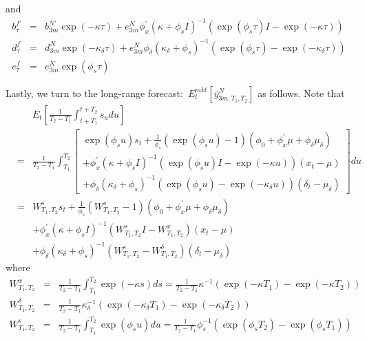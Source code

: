 \documentclass{article}
\begin{document}
and%
\begin{eqnarray*}
b_{\tau }^{f\prime } &=&b_{3m}^{N\prime }\exp \left( -\kappa \tau \right)
+e_{3m}^{N}\phi _{x}^{\prime }\left( \kappa +\phi _{s}I\right) ^{-1}\left(
\exp \left( \phi _{s}\tau \right) I-\exp \left( -\kappa \tau \right) \right)
\\
d_{\tau }^{f} &=&d_{3m}^{N}\exp \left( -\kappa _{\delta }\tau \right)
+e_{3m}^{N}\phi _{\delta }\left( \kappa _{\delta }+\phi _{s}\right)
^{-1}\left( \exp \left( \phi _{s}\tau \right) -\exp \left( -\kappa _{\delta
}\tau \right) \right) \\
e_{\tau }^{f} &=&e_{3m}^{N}\exp \left( \phi _{s}\tau \right)
\end{eqnarray*}

Lastly, we turn to the long-range forecast:\ $E_{t}^{mkt}\left[ \overline{y}%
_{3m,T_{1},T_{2}}^{N}\right] $ as follows. Note that%
\begin{eqnarray*}
&&E_{t}\left[ \frac{1}{T_{2}-T_{1}}\int_{t+T_{1}}^{t+T_{2}}s_{u}du\right]  \\
&=&\frac{1}{T_{2}-T_{1}}\int_{T_{1}}^{T_{2}}\left[ 
\begin{array}{c}
\exp \left( \phi _{s}u\right) s_{t}+\frac{1}{\phi _{s}}\left( \exp \left(
\phi _{s}u\right) -1\right) \left( \phi _{0}+\phi _{x}^{\prime }\mu +\phi
_{\delta }\mu _{\delta }\right)  \\ 
+\phi _{x}^{\prime }\left( \kappa +\phi _{s}I\right) ^{-1}\left( \exp \left(
\phi _{s}u\right) I-\exp \left( -\kappa u\right) \right) \left( x_{t}-\mu
\right)  \\ 
+\phi _{\delta }\left( \kappa _{\delta }+\phi _{s}\right) ^{-1}\left( \exp
\left( \phi _{s}u\right) -\exp \left( -\kappa _{\delta }u\right) \right)
\left( \delta _{t}-\mu _{\delta }\right) 
\end{array}%
\right] du \\
&=&W_{T_{1},T_{2}}^{s}s_{t}+\frac{1}{\phi _{s}}\left(
W_{T_{1},T_{2}}^{s}-1\right) \left( \phi _{0}+\phi _{x}^{\prime }\mu +\phi
_{\delta }\mu _{\delta }\right)  \\
&&+\phi _{x}^{\prime }\left( \kappa +\phi _{s}I\right) ^{-1}\left(
W_{T_{1},T_{2}}^{s}I-W_{T_{1},T_{2}}^{x}\right) \left( x_{t}-\mu \right)  \\
&&+\phi _{\delta }\left( \kappa _{\delta }+\phi _{s}\right) ^{-1}\left(
W_{T_{1},T_{2}}^{s}-W_{T_{1},T_{2}}^{\delta }\right) \left( \delta _{t}-\mu
_{\delta }\right) 
\end{eqnarray*}%
where%
\begin{eqnarray*}
W_{T_{1},T_{2}}^{x} &=&\frac{1}{T_{2}-T_{1}}\int_{T_{1}}^{T_{2}}\exp \left(
-\kappa s\right) ds=\frac{1}{T_{2}-T_{1}}\kappa ^{-1}\left( \exp \left(
-\kappa T_{1}\right) -\exp \left( -\kappa T_{2}\right) \right)  \\
W_{T_{1},T_{2}}^{\delta } &=&\frac{1}{T_{2}-T_{1}}\kappa _{\delta
}^{-1}\left( \exp \left( -\kappa _{\delta }T_{1}\right) -\exp \left( -\kappa
_{\delta }T_{2}\right) \right)  \\
W_{T_{1},T_{2}}^{s} &=&\frac{1}{T_{2}-T_{1}}\int_{T_{1}}^{T_{2}}\exp \left(
\phi _{s}u\right) du=\frac{1}{T_{2}-T_{1}}\phi _{s}^{-1}\left( \exp \left(
\phi _{s}T_{2}\right) -\exp \left( \phi _{s}T_{1}\right) \right) 
\end{eqnarray*}
\end{document}
